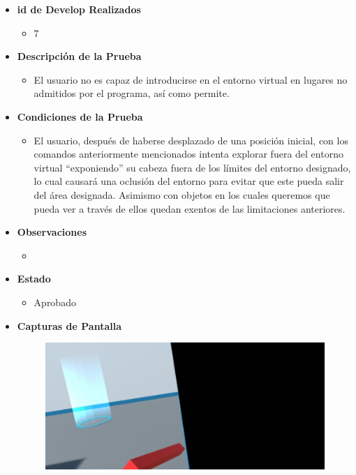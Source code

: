 \begin{itemize}
    \item \textbf{id de Develop Realizados}
    \begin{itemize}
        \item 7
    \end{itemize}
    \item \textbf{Descripción de la Prueba}
    \begin{itemize}
        \item El usuario no es capaz de introducirse en el entorno virtual en lugares no admitidos por el programa, así como permite.
    \end{itemize}
    \item \textbf{Condiciones de la Prueba}
    \begin{itemize}
        \item El usuario, después de haberse desplazado de una posición inicial, con los comandos anteriormente mencionados intenta explorar fuera del entorno virtual “exponiendo” su cabeza fuera de los límites del entorno designado, lo cual causará una oclusión del entorno para evitar que este pueda salir del área designada.
        Asimismo con objetos en los cuales queremos que pueda ver a través de ellos quedan exentos de las limitaciones anteriores.     
    \end{itemize}
    \item \textbf{Observaciones}
    \begin{itemize}
        \item 
    \end{itemize}
    \item \textbf{Estado}
    \begin{itemize}
        \item Aprobado
    \end{itemize}
    \item \textbf{Capturas de Pantalla}
    \begin{figure}[H]
       	\begin{center}
       		\includegraphics[width = .7\textwidth]{source/images/image39.png}

\end{center}
\end{figure}
\end{itemize}
